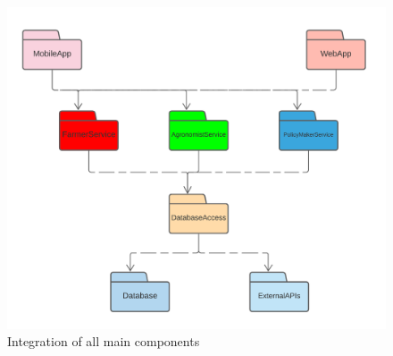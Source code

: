 \begin{center}
    \begin{figure}[h!]
  \includegraphics[width=\textwidth,height=\textheight,keepaspectratio]{./Images/IntegrationStrategy/IT4.png}
  \caption{Integration of all main components}
\end{figure}
\end{center}


\clearpage